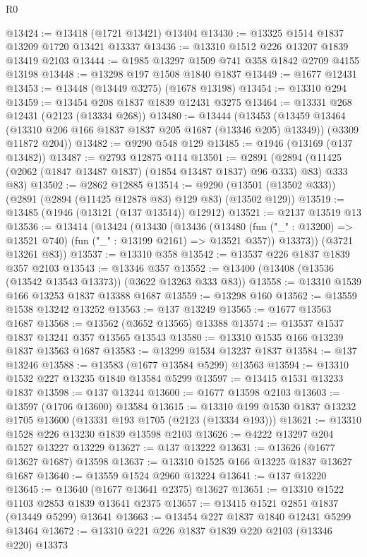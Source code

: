 \begin{lexlean}{R0}
\begin{coremodule}
@13424 := @13418 (@1721 @13421) @13404
@13430 := @13325 @1514 @1837 @13209 @1720 @13421 @13337
@13436 := @13310 @1512 @226 @13207 @1839 @13419 @2103
@13444 := @1985 @13297 @1509 @741 @358 @1842 @2709 @4155 @13198
@13448 := @13298 @197 @1508 @1840 @1837
@13449 := @1677 @12431
@13453 := @13448 (@13449 @3275) (@1678 @13198)
@13454 := @13310 @294
@13459 := @13454 @208 @1837 @1839 @12431 @3275
@13464 := @13331 @268 @12431 (@2123 (@13334 @268))
@13480 := @13444
    (@13453
      (@13459 @13464 (@13310 @206 @166 @1837 @1837 @205 @1687 (@13346 @205) @13349))
      (@3309 @11872 @204))
@13482 := @9290 @548 @129
@13485 := @1946 (@13169 (@137 @13482))
@13487 := @2793 @12875 @114
@13501 := @2891
    (@2894 (@11425 (@2062 (@1847 @13487 @1837) (@1854 @13487 @1837) @96 @333) @83) @333 @83)
@13502 := @2862 @12885
@13514 := @9290 (@13501 (@13502 @333)) (@2891 (@2894 (@11425 @12878 @83) @129 @83) (@13502 @129))
@13519 := @13485 (@1946 (@13121 (@137 @13514)) @12912)
@13521 := @2137 @13519 @13
@13536 := @13414
    (@13424
      (@13430
        (@13436
          (@13480 (fun ("_" : @13200) => @13521 @740) (fun ("_" : @13199 @2161) => @13521 @357))
          @13373))
      (@3721 @13261 @83))
@13537 := @13310 @358
@13542 := @13537 @226 @1837 @1839 @357 @2103
@13543 := @13346 @357
@13552 := @13400 (@13408 (@13536 (@13542 @13543 @13373)) (@3622 @13263 @333 @83))
@13558 := @13310 @1539 @166 @13253 @1837 @13388 @1687
@13559 := @13298 @160
@13562 := @13559 @1538 @13242 @13252
@13563 := @137 @13249
@13565 := @1677 @13563 @1687
@13568 := @13562 (@3652 @13565) @13388
@13574 := @13537 @1537 @1837 @13241 @357 @13565 @13543
@13580 := @13310 @1535 @166 @13239 @1837 @13563 @1687
@13583 := @13299 @1534 @13237 @1837
@13584 := @137 @13246
@13588 := @13583 (@1677 @13584 @5299) @13563
@13594 := @13310 @1532 @227 @13235 @1840 @13584 @5299
@13597 := @13415 @1531 @13233 @1837
@13598 := @137 @13244
@13600 := @1677 @13598 @2103
@13603 := @13597 (@1706 @13600) @13584
@13615 := @13310 @199 @1530 @1837 @13232 @1705 @13600 (@13331 @193 @1705 (@2123 (@13334 @193)))
@13621 := @13310 @1528 @226 @13230 @1839 @13598 @2103
@13626 := @4222 @13297 @204 @1527 @13227 @13229
@13627 := @137 @13222
@13631 := @13626 (@1677 @13627 @1687) @13598
@13637 := @13310 @1525 @166 @13225 @1837 @13627 @1687
@13640 := @13559 @1524 @2960 @13224
@13641 := @137 @13220
@13645 := @13640 (@1677 @13641 @2375) @13627
@13651 := @13310 @1522 @1103 @2853 @1839 @13641 @2375
@13657 := @13415 @1521 @2851 @1837 (@13449 @5299) @13641
@13663 := @13454 @227 @1837 @1840 @12431 @5299 @13464
@13672 := @13310 @221 @226 @1837 @1839 @220 @2103 (@13346 @220) @13373

\end{coremodule}
\end{lexlean}
